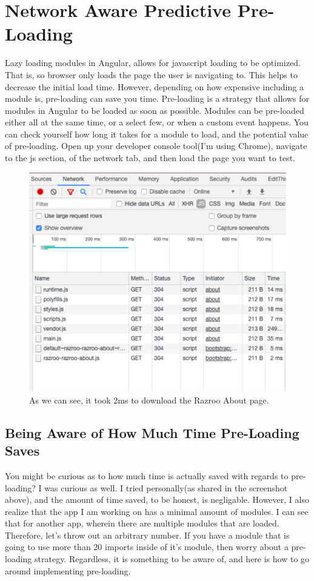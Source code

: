 \chapter{ Network Aware Predictive Pre-Loading }

Lazy loading modules in Angular, allows for javascript loading to be optimized. 
That is, so browser only loads the page the user is navigating to. This helps to
decrease the initial load time. However, depending on how expensive including a
module is, pre-loading can save you time. Pre-loading is a strategy that allows
for modules in Angular to be loaded as soon as possible. Modules can be pre-loaded 
either all at the same time, or a select few, or when a custom event happens. You
can check yourself how long it takes for a module to load, and the potential value 
of pre-loading. Open up your developer console tool(I'm using Chrome), navigate to
the js section, of the network tab, and then load the page you want to test. 

\begin{figure}[h]
\includegraphics[width=414pt]{architecture/lazy-loading/network-aware-preloading/network-preloading-console-screenshot.pdf}
\caption{As we can see, it took 2ms to download the Razroo About page.}
\end{figure}

\section{ Being Aware of How Much Time Pre-Loading Saves }
You might be curious as to how much time is actually saved with regards to 
pre-loading? I was curious as well. I tried personally(as shared in the screenshot 
above), and the amount of time saved, to be honest, is negligable. However, I also
realize that the app I am working on has a minimal amount of modules. I can see that 
for another app, wherein there are multiple modules that are loaded. Therefore, 
let's throw out an arbitrary number. If you have a module that is going to 
use more than 20 imports inside of it's module, then worry about a pre-loading 
strategy. Regardless, it is something to be aware of, and here is how to go 
around implementing pre-loading. 

